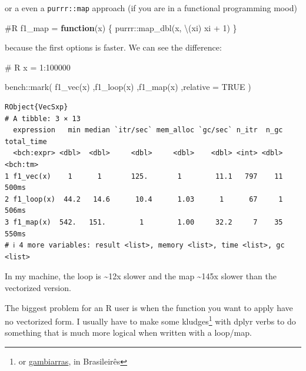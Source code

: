 \documentclass[
  letterpaper,
  DIV=11,
  numbers=noendperiod]{scrartcl}
\newenvironment{Shaded}{\begin{snugshade}}{\end{snugshade}}
\newcommand{\AttributeTok}[1]{\textcolor[rgb]{0.40,0.45,0.13}{#1}}
\newcommand{\CommentTok}[1]{\textcolor[rgb]{0.37,0.37,0.37}{#1}}
\newcommand{\ConstantTok}[1]{\textcolor[rgb]{0.56,0.35,0.01}{#1}}
\newcommand{\ControlFlowTok}[1]{\textcolor[rgb]{0.00,0.23,0.31}{\textbf{#1}}}
\newcommand{\DecValTok}[1]{\textcolor[rgb]{0.68,0.00,0.00}{#1}}
\newcommand{\FunctionTok}[1]{\textcolor[rgb]{0.28,0.35,0.67}{#1}}
\newcommand{\NormalTok}[1]{\textcolor[rgb]{0.00,0.23,0.31}{#1}}
\newcommand{\OtherTok}[1]{\textcolor[rgb]{0.00,0.23,0.31}{#1}}
\newcommand{\SpecialCharTok}[1]{\textcolor[rgb]{0.37,0.37,0.37}{#1}}
\begin{document}
or a even a \texttt{purrr::map} approach (if you are in a functional
programming mood)

\begin{Shaded}
\begin{Highlighting}[]
\CommentTok{\#R}
\NormalTok{f1\_map }\OtherTok{=} \ControlFlowTok{function}\NormalTok{(x) \{}
\NormalTok{    purrr}\SpecialCharTok{::}\FunctionTok{map\_dbl}\NormalTok{(x, \textbackslash{}(xi) xi }\SpecialCharTok{+} \DecValTok{1}\NormalTok{)}
\NormalTok{\}}
\end{Highlighting}
\end{Shaded}

because the first options is faster. We can see the difference:

\begin{Shaded}
\begin{Highlighting}[]
\CommentTok{\# R}
\NormalTok{x }\OtherTok{=} \DecValTok{1}\SpecialCharTok{:}\DecValTok{100000}

\NormalTok{bench}\SpecialCharTok{::}\FunctionTok{mark}\NormalTok{(}
    \FunctionTok{f1\_vec}\NormalTok{(x)}
\NormalTok{    ,}\FunctionTok{f1\_loop}\NormalTok{(x)}
\NormalTok{    ,}\FunctionTok{f1\_map}\NormalTok{(x)}
\NormalTok{    ,}\AttributeTok{relative =} \ConstantTok{TRUE}
\NormalTok{)}
\end{Highlighting}
\end{Shaded}

\begin{verbatim}
RObject{VecSxp}
# A tibble: 3 × 13
  expression   min median `itr/sec` mem_alloc `gc/sec` n_itr  n_gc total_time
  <bch:expr> <dbl>  <dbl>     <dbl>     <dbl>    <dbl> <int> <dbl>   <bch:tm>
1 f1_vec(x)    1      1       125.       1        11.1   797    11      500ms
2 f1_loop(x)  44.2   14.6      10.4      1.03      1      67     1      506ms
3 f1_map(x)  542.   151.        1        1.00     32.2     7    35      550ms
# ℹ 4 more variables: result <list>, memory <list>, time <list>, gc <list>
\end{verbatim}

In my machine, the loop is \textasciitilde12x slower and the map
\textasciitilde145x slower than the vectorized version.

The biggest problem for an R user is when the function you want to apply
have no vectorized form. I usually have to make some kludges\footnote{or
  \href{https://pt.wikipedia.org/wiki/Gambiarra}{gambiarras}, in
  Brasileirês} with dplyr verbs to do something that is much more
logical when written with a loop/map.
\end{document}

